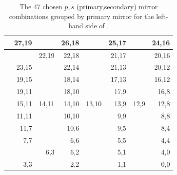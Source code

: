 \begin{table}[htb]
  \caption{
    The 47 chosen $p,s$ (primary,secondary) mirror combinations grouped by primary mirror for the left-hand side of \richtwo.}
  \vspace{-0.5\baselineskip}
  \centering
  \small
  \sffamily
  \begin{tabular}{*{4}{|d{2}d{2}}|}
    \hline
           & 27,19 &       & 26,18 &       & 25,17 &       & 24,16 \\
    \hline
           &       & 22,19 & 22,18 &       & 21,17 &       & 20,16 \\
           & 23,15 &       & 22,14 &       & 21,13 &       & 20,12 \\
    \hline
           & 19,15 &       & 18,14 &       & 17,13 &       & 16,12 \\
           & 19,11 &       & 18,10 &       & 17,9  &       & 16,8  \\
    \hline
           & 15,11 & 14,11 & 14,10 & 13,10 & 13,9  & 12,9  & 12,8  \\
    \hline
           & 11,11 &       & 10,10 &       &  9,9  &       &  8,8  \\
           & 11,7  &       & 10,6  &       &  9,5  &       &  8,4  \\
    \hline
           &  7,7  &       &  6,6  &       &  5,5  &       &  4,4  \\
           &       &  6,3  &  6,2  &       &  5,1  &       &  4,0  \\
    \hline
           &  3,3  &       &  2,2  &       &  1,1  &       &  0,0  \\
    \hline
  \end{tabular}
  \label{tab:ChosenConbinationsPri}
  \vspace{-0.5\baselineskip}
\end{table}

